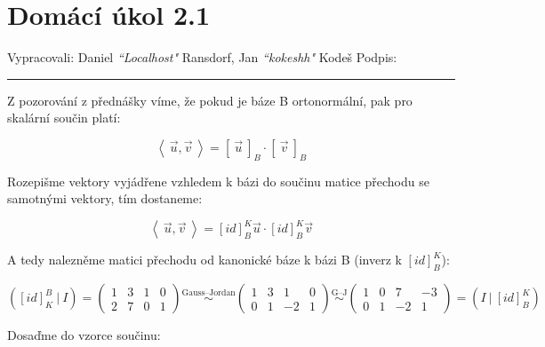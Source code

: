 \documentclass[12pt]{article}
\begin{document}
\section*{Domácí úkol 2.1}

Vypracovali: Daniel \textit{``Localhost"} Ransdorf, Jan \textit{``kokeshh"} Kodeš \hfill Podpis: \rule{4cm}{0.4pt}


\bigskip

Z pozorování z přednášky víme, že pokud je báze B ortonormální, pak pro skalární součin platí:

\[
  \left<\ \vec{u},\vec{v}\ \right> = \left[\ \vec{u}\ \right]_B \cdot \left[\ \vec{v}\ \right]_B
\]

Rozepišme vektory vyjádřene vzhledem k bázi do součinu matice přechodu se samotnými vektory, tím dostaneme:

\[
  \left<\ \vec{u},\vec{v}\ \right> = \left[id\right]_B^K \vec{u} \cdot \left[id\right]_B^K \vec{v}
\]

A tedy nalezněme matici přechodu od kanonické báze k bázi B (inverz k $\left[id\right]_B^K $):

\[
  \left( \left[id\right]_K^B \ |\ I \right) = \left(\begin{array}{cc|cc}
    1&3 & 1&0 \\
    2&7 & 0&1
  \end{array}\right)
  \overset{\text{Gauss--Jordan}}{\sim}
  \left(\begin{array}{cc|cc}
    1&3 & 1&0 \\
    0&1 & -2&1
  \end{array}\right)
  \overset{\text{G--J}}{\sim}
  \left(\begin{array}{cc|cc}
    1&0 & 7&-3 \\
    0&1 & -2&1
  \end{array}\right)
  = \left( I \ |\ \left[id\right]_B^K \right)
\]

Dosaďme do vzorce součinu:
\end{document}
